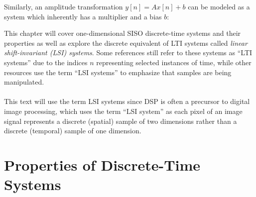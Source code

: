 \documentclass{report}
\begin{document}
Similarly, an amplitude transformation 
$y[n]=Ax[n]+b$ can be modeled as a system which inherently has a multiplier and a bias $b$:
\begin{center}
\end{center}

This chapter will cover one-dimensional SISO discrete-time systems and their properties as well as explore 
the discrete equivalent of LTI systems called \emph{linear shift-invariant (LSI) systems}. Some references 
still refer to these systems as ``LTI systems'' due to the indices $n$ representing selected instances of time, 
while other resources use the term ``LSI systems'' to emphasize that samples are being manipulated. 
\\ \\
This text will use the term LSI systems since DSP is often a precursor to digital image processing, which uses 
the term ``LSI system'' as each pixel of an image signal represents a discrete (spatial) sample of two dimensions 
rather than a discrete (temporal) sample of one dimension.

\section{Properties of Discrete-Time Systems}
\end{document}

